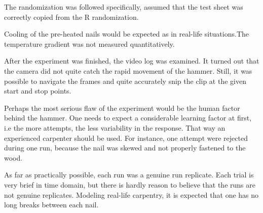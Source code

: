 The randomization was followed specifically, assumed that the test sheet was correctly copied from the R randomization.

Cooling of the pre-heated nails would be expected as in real-life situations.The temperature gradient was not measured quantitatively. 

After the experiment was finished, the video log was examined. It turned out that the camera did not quite catch the rapid movement of the hammer. Still, it was possible to navigate the frames and quite accurately snip the clip at the given start and stop points.

Perhaps the most serious flaw of the experiment would be the human factor behind the hammer. One needs to expect a considerable learning factor at first, i.e the more attempts, the less variability in the response. That way an experienced carpenter should be used. For instance, one attempt were rejected during one run, because the nail was skewed and not properly fastened to the wood. 

As far as practically possible, each run was a genuine run replicate. Each trial is very brief in time domain, but there is hardly reason to believe that the runs are not genuine replicates. Modeling real-life carpentry, it is expected that one has no long breaks between each nail. 

